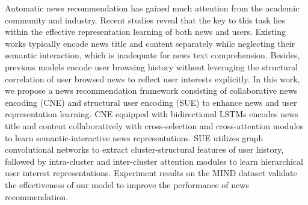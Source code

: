Automatic news recommendation has gained much attention from the academic community and industry. Recent studies reveal that the key to this task lies within the effective representation learning of both news and users. Existing works typically encode news title and content separately while neglecting their semantic interaction, which is inadequate for news text comprehension. Besides, previous models encode user browsing history without leveraging the structural correlation of user browsed news to reflect user interests explicitly. In this work, we propose a news recommendation framework consisting of collaborative news encoding (CNE) and structural user encoding (SUE) to enhance news and user representation learning. CNE equipped with bidirectional LSTMs encodes news title and content collaboratively with cross-selection and cross-attention modules to learn semantic-interactive news representations. SUE utilizes graph convolutional networks to extract cluster-structural features of user history, followed by intra-cluster and inter-cluster attention modules to learn hierarchical user interest representations. Experiment results on the MIND dataset validate the effectiveness of our model to improve the performance of news recommendation.
